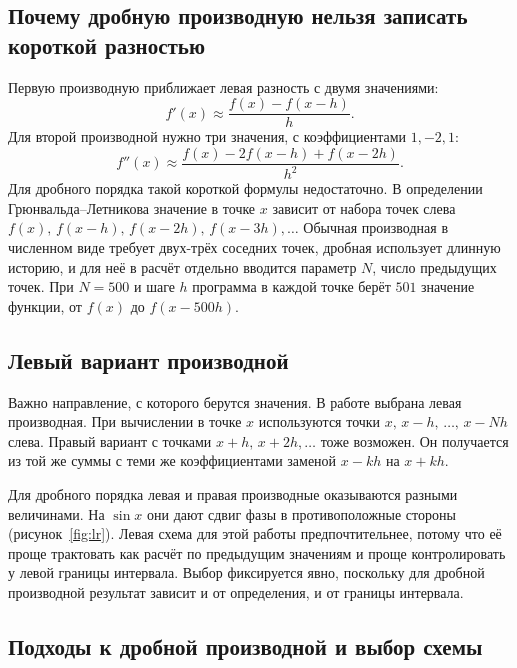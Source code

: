 \documentclass[14pt,a4paper]{extarticle}
\begin{document}
\subsection{Почему дробную производную нельзя записать короткой разностью}

Первую производную приближает левая разность с двумя значениями:
\begin{equation}
f'(x)\approx\frac{f(x)-f(x-h)}{h}.
\end{equation}
Для второй производной нужно три значения, с коэффициентами $1,-2,1$:
\begin{equation}
f''(x)\approx\frac{f(x)-2f(x-h)+f(x-2h)}{h^2}.
\end{equation}
Для дробного порядка такой короткой формулы недостаточно. В определении Грюнвальда--Летникова значение в точке $x$ зависит от набора точек слева $f(x),\,f(x-h),\,f(x-2h),\,f(x-3h),\dots$ Обычная производная в численном виде требует двух-трёх соседних точек, дробная использует длинную историю, и для неё в расчёт отдельно вводится параметр $N$, число предыдущих точек. При $N=500$ и шаге $h$ программа в каждой точке берёт $501$ значение функции, от $f(x)$ до $f(x-500h)$.

\subsection{Левый вариант производной}

Важно направление, с которого берутся значения. В работе выбрана левая производная. При вычислении в точке $x$ используются точки $x,\,x-h,\,\dots,\,x-Nh$ слева. Правый вариант с точками $x+h,\,x+2h,\dots$ тоже возможен. Он получается из той же суммы с теми же коэффициентами заменой $x-kh$ на $x+kh$.

Для дробного порядка левая и правая производные оказываются разными величинами. На $\sin x$ они дают сдвиг фазы в противоположные стороны (рисунок~\ref{fig:lr}). Левая схема для этой работы предпочтительнее, потому что её проще трактовать как расчёт по предыдущим значениям и проще контролировать у левой границы интервала. Выбор фиксируется явно, поскольку для дробной производной результат зависит и от определения, и от границы интервала.

\subsection{Подходы к дробной производной и выбор схемы}
\end{document}
